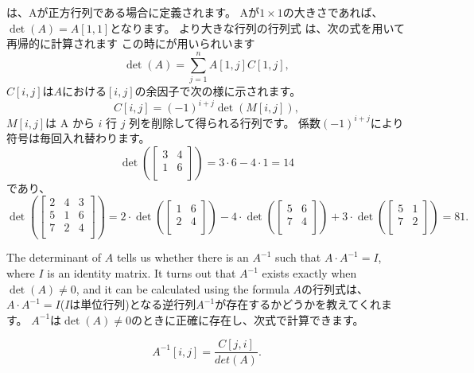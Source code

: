
は、Aが正方行列である場合に定義されます。
Aが$1 \times 1$の大きさであれば、$\det(A)=A[1,1]$となります。
より大きな行列の行列式 は、次の式を用いて再帰的に計算されます
この時にが用いられいます
\[\det(A)=\sum_{j=1}^n A[1,j] C[1,j],\]
$C[i,j]$は$A$における$[i,j]$の余因子で次の様に示されます。
\[C[i,j] = (-1)^{i+j} \det(M[i,j]),\]
$M[i,j]$は A から $i$ 行 $j$ 列を削除して得られる行列です。
係数$(-1)^{i+j}$により符号は毎回入れ替わります。
\[
\det(
 \begin{bmatrix}
  3 & 4 \\
  1 & 6 \\
 \end{bmatrix}
) = 3 \cdot 6 - 4 \cdot 1 = 14
\]
であり、
\[
\det(
 \begin{bmatrix}
  2 & 4 & 3 \\
  5 & 1 & 6 \\
  7 & 2 & 4 \\
 \end{bmatrix}
) =
2 \cdot
\det(
 \begin{bmatrix}
  1 & 6 \\
  2 & 4 \\
 \end{bmatrix}
)
-4 \cdot
\det(
 \begin{bmatrix}
  5 & 6 \\
  7 & 4 \\
 \end{bmatrix}
)
+3 \cdot
\det(
 \begin{bmatrix}
  5 & 1 \\
  7 & 2 \\
 \end{bmatrix}
) = 81.
\]


The determinant of $A$ tells us
whether there is an 
$A^{-1}$ such that $A \cdot A^{-1} = I$,
where $I$ is an identity matrix.
It turns out that $A^{-1}$ exists
exactly when $\det(A) \neq 0$,
and it can be calculated using the formula
$A$の行列式は、$A \cdot A^{-1} = I$($I$は単位行列)となる逆行列$A^{-1}$が存在するかどうかを教えてくれます。
$A^{-1}$は$\det(A) \neq 0$のときに正確に存在し、次式で計算できます。

\[A^{-1}[i,j] = \frac{C[j,i]}{det(A)}.\]

